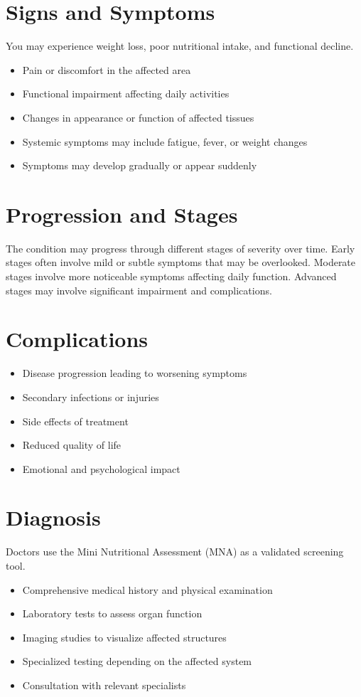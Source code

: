 \section{Signs and Symptoms}
You may experience weight loss, poor nutritional intake, and functional decline.

\begin{itemize}[noitemsep]
  \item Pain or discomfort in the affected area
  \item Functional impairment affecting daily activities
  \item Changes in appearance or function of affected tissues
  \item Systemic symptoms may include fatigue, fever, or weight changes
  \item Symptoms may develop gradually or appear suddenly
\end{itemize}
\section{Progression and Stages}
The condition may progress through different stages of severity over time. Early stages often involve mild or subtle symptoms that may be overlooked. Moderate stages involve more noticeable symptoms affecting daily function. Advanced stages may involve significant impairment and complications.
\section{Complications}
\begin{itemize}[noitemsep]
  \item Disease progression leading to worsening symptoms
  \item Secondary infections or injuries
  \item Side effects of treatment
  \item Reduced quality of life
  \item Emotional and psychological impact
\end{itemize}
\section{Diagnosis}
Doctors use the Mini Nutritional Assessment (MNA) as a validated screening tool.

\begin{itemize}[noitemsep]
  \item Comprehensive medical history and physical examination
  \item Laboratory tests to assess organ function
  \item Imaging studies to visualize affected structures
  \item Specialized testing depending on the affected system
  \item Consultation with relevant specialists
\end{itemize}
